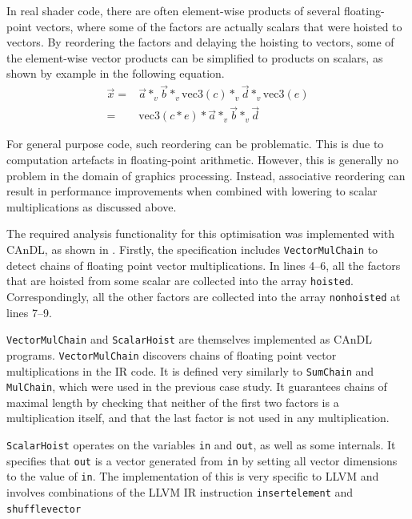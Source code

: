     In real shader code, there are often element-wise products of several
    floating-point vectors, where some of the factors are actually scalars
    that were hoisted to vectors.
    By reordering the factors and delaying the hoisting to vectors, some of the
    element-wise vector products can be simplified to products on scalars, as
    shown by example in the following equation.
    \begin{align*}
        \vec x={}&\vec a*_v\vec b*_v\text{vec3}(c)*_v\vec d*_v\text{vec3}(e)\\
        ={}&\text{vec3}(c*e)*\vec a*_v\vec b*_v\vec d
    \end{align*}

    For general purpose code, such reordering can be problematic.
    This is due to computation artefacts in floating-point arithmetic.
    However, this is generally no problem in the domain of graphics processing.
    Instead, associative reordering can result in performance improvements
    when combined with lowering to scalar multiplications as discussed above.

    The required analysis functionality for this optimisation was implemented
    with CAnDL, as shown in .
    Firstly, the specification includes \texttt{VectorMulChain} to detect 
    chains of floating point vector multiplications.
    In lines 4--6, all the factors that are hoisted from some scalar are
    collected into the array {\tt hoisted}.
    Correspondingly, all the other factors are collected into the array
    {\tt nonhoisted} at lines 7--9.

    {\tt VectorMulChain} and {\tt ScalarHoist} are themselves implemented as
    CAnDL programs.
    {\tt VectorMulChain} discovers chains of floating point vector
    multiplications in the IR code.
    It is defined very similarly to {\tt SumChain} and {\tt MulChain}, which
    were used in the previous case study.
    It guarantees chains of maximal length by checking that neither of the first
    two factors is a multiplication itself, and that the last factor is not used
    in any multiplication.

    \texttt{ScalarHoist} operates on the variables {\tt in} and {\tt out}, as
    well as some internals.
    It specifies that {\tt out} is a vector generated from {\tt in} by setting
    all vector dimensions to the value of {\tt in}.
    The implementation of this is very specific to LLVM and involves
    combinations of the LLVM IR instruction {\tt insertelement} and
    {\tt shufflevector}

